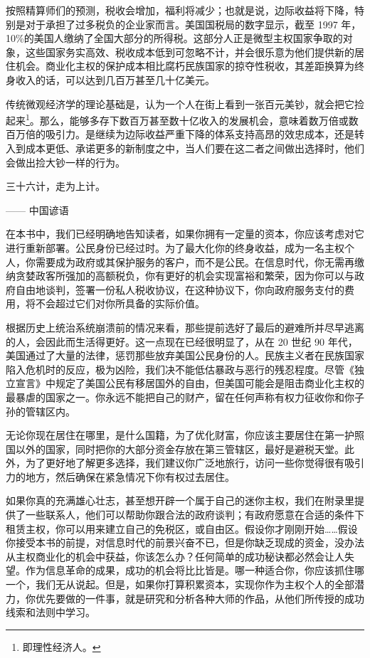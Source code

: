 按照精算师们的预测，税收会增加，福利将减少；也就是说，边际收益将下降，特别是对于承担了过多税负的企业家而言。美国国税局的数字显示，截至 1997 年，10\%的美国人缴纳了全国大部分的所得税。这部分人正是微型主权国家争取的对象，这些国家务实高效、税收成本低到可忽略不计，并会很乐意为他们提供新的居住机会。商业化主权的保护成本相比腐朽民族国家的掠夺性税收，其差距换算为终身收入的话，可以达到几百万甚至几十亿美元。

传统微观经济学的理论基础是，认为一个人在街上看到一张百元美钞，就会把它捡起来\footnote{即理性经济人。}。那么，能够多存下数百万甚至数十亿收入的发展机会，意味着数万倍或数百万倍的吸引力。是继续为边际收益严重下降的体系支持高昂的效忠成本，还是转入到成本更低、承诺更多的新制度之中，当人们要在这二者之间做出选择时，他们会做出捡大钞一样的行为。

\begin{tcolorbox}
\kaishu 三十六计，走为上计。
\begin{flushright}
—— 中国谚语
\end{flushright}
\end{tcolorbox}

在本书中，我们已经明确地告知读者，如果你拥有一定量的资本，你应该考虑对它进行重新部署。公民身份已经过时。为了最大化你的终身收益，成为一名主权个人，你需要成为政府或其保护服务的客户，而不是公民。在信息时代，你无需再缴纳贪婪政客所强加的高额税负，你有更好的机会实现富裕和繁荣，因为你可以与政府自由地谈判，签署一份私人税收协议，在这种协议下，你向政府服务支付的费用，将不会超过它们对你所具备的实际价值。

根据历史上统治系统崩溃前的情况来看，那些提前选好了最后的避难所并尽早逃离的人，会因此而生活得更好。这一点现在已经很明显了，从在 20 世纪 90 年代，美国通过了大量的法律，惩罚那些放弃美国公民身份的人。民族主义者在民族国家陷入危机时的反应，极为凶险，我们决不能低估暴政与恶行的残忍程度。尽管《独立宣言》中规定了美国公民有移居国外的自由，但美国可能会是阻击商业化主权的最暴虐的国家之一。你永远不能把自己的财产，留在任何声称有权力征收你和你子孙的管辖区内。

无论你现在居住在哪里，是什么国籍，为了优化财富，你应该主要居住在第一护照国以外的国家，同时把你的大部分资金存放在第三管辖区，最好是避税天堂。此外，为了更好地了解更多选择，我们建议你广泛地旅行，访问一些你觉得很有吸引力的地方，然后确保在紧急情况下你有权过去居住。

如果你真的充满雄心壮志，甚至想开辟一个属于自己的迷你主权，我们在附录里提供了一些联系人，他们可以帮助你跟合法的政府谈判；有政府愿意在合适的条件下租赁主权，你可以用来建立自己的免税区，或自由区。假设你才刚刚开始……假设你接受本书的前提，对信息时代的前景兴奋不已，但是你缺乏现成的资金，没办法从主权商业化的机会中获益，你该怎么办？任何简单的成功秘诀都必然会让人失望。作为信息革命的成果，成功的机会将比比皆是。哪一种适合你，你应该抓住哪一个，我们无从说起。但是，如果你打算积累资本，实现你作为主权个人的全部潜力，你优先要做的一件事，就是研究和分析各种大师的作品，从他们所传授的成功线索和法则中学习。

